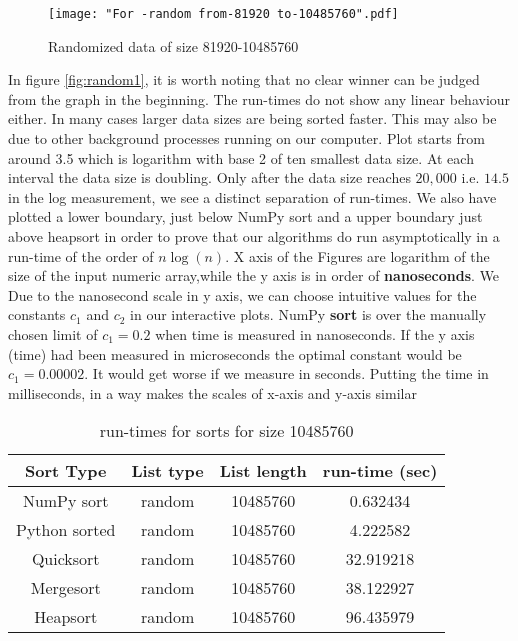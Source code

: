 \documentclass[sigconf, nonacm, natbib, screen, balance=False]{acmart}
\begin{document}
\begin{figure}[ht]
\texttt{[image: "For -random from-81920 to-10485760".pdf]}
    \caption{Randomized data of size 81920-10485760}
    \label{fig:random2}
\end{figure}

In figure \ref{fig:random1}, it is worth noting that no clear winner can be judged from the graph in the beginning. The run-times do not show any linear behaviour either. In many cases larger data sizes are being sorted faster. This may also be due to other background processes running on our computer. Plot starts from around 3.5 which is logarithm with base 2 of ten smallest data size. At each interval the data size is doubling. Only after the data size reaches \textbf{$20,000$} i.e. \textbf{$14.5$} in the log measurement, we see a distinct separation of run-times. \newline
We also have plotted a lower boundary, just below NumPy sort and a upper boundary just above heapsort in order to prove that our algorithms do run asymptotically in a run-time of the order of \textbf{$n\log \left(n\right)$}. X axis of the Figures are logarithm of the size of the input numeric array,while the y axis is in order of \textbf{nanoseconds}. We  Due to the nanosecond scale in y axis, we can choose intuitive values for the constants $c_1$ and $c_2$  in our interactive plots. NumPy \textbf{sort} is over the manually chosen limit of \textbf{$c_1=0.2$} when time is measured in nanoseconds. If the y axis (time) had been measured in microseconds the optimal constant would be $c_1=0.00002$. It would get worse if we measure in seconds. Putting the time in milliseconds, in a way makes the scales of x-axis and y-axis similar

\begin{table}[ht]
\caption{run-times for sorts for size 10485760}
\label{tab:table1}
\begin{center}
\begin{tabular}{|c|c|c|c|} 
\hline
Sort Type & List type & List length & run-time (sec) \\
\hline
NumPy sort &	random &	10485760 &	0.632434 \\
Python sorted &	random &	10485760 &	4.222582 \\
Quicksort &	random &	10485760 &	32.919218 \\
Mergesort &	random &	10485760 &	38.122927 \\
Heapsort &	random &	10485760 &	96.435979 \\
\hline
\end{tabular}
\end{center}
\end{table}
\end{document}
